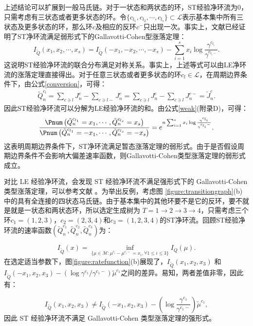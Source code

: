 上述结论可以扩展到一般马氏链。对于一状态和两状态的环，ST经验净环流为0，只需考虑有三状态或者更多状态的环。令$\{c_{l_1}, c_{l_2},\cdots, c_{l_s}\} \subset \mathcal{L}$表示基本集中所有三状态及更多状态的环，那么环$c$及相应的反环$c^-$只出现一次。事实上，文献\cite{andrieux2007fluctuation}已经证明了ST净环流满足弱形式下的Gallavotti-Cohen型涨落定理：
\begin{equation} \label{Gallavotti}
    I_{\tilde{Q}}(x_1,x_2,\cdots,x_s)
    = I_{\tilde{Q}}(-x_1,-x_2,\cdots,-x_s)
    -\sum_{i=1}^s x_i\log\frac{\gamma^{c_{l_i}}}{\gamma^{c_{l_{i}-}}}.
\end{equation}
这说明ST经验净环流的联合分布满足对称关系。事实上，上述等式可以由LE净环流的涨落定理直接得出。对于任意三状态或者更多状态的环$c_l \in \mathcal{L}$，在周期边界条件下，由公式\ref{conversion}，可得：
\begin{equation*}\label{circulation}
    \begin{split}
    \tilde{Q}^{c_l}_n =\sum_{c\ni l}J^c_n-\sum_{c\ni l-}J^c_n
    =\sum_{c\ni l}J^c_n-\sum_{c\ni l}J^{c-}_n = \tilde{J}^c_n.
    \end{split}
\end{equation*}
因此ST经验净环流可以分解为LE经验净环流的和。由公式\ref{weak}(附录D)，可得：
\begin{equation}\label{weak}
    \begin{split}
    \frac{\Pnum\left(\tilde{Q}^{c_{l_1}}_n=x_1,\cdots, \tilde{Q}^{c_{l_s}}_n=x_{s}\right)}
    {\Pnum\left(\tilde{Q}^{c_{l_1}}_n=-x_1,\cdots, \tilde{Q}^{c_{l_s}}_n=-x_{s}\right)}
    =e^{n\sum_{i=1}^{s}x_i\log\frac{\gamma^{c_{l_i}}}{\gamma^{c_{l_i}-}}}.
    \end{split}
\end{equation}
这表明周期边界条件下，ST净环流满足暂态涨落定理的弱形式。由于是否假设周期边界条件不会影响大偏差速率函数，则Gallavotti-Cohen类型涨落定理的弱形式 \cite{Gallavotti} 成立。

对比 LE 经验净环流，会发现 ST 经验净环流不满足强形式下的 Gallavotti-Cohen 类型涨落定理，可以参考文献 \cite{mehl2012role, polettini2017effective, uhl2018fluctuations, kahlen2018hidden}。为举出反例，考虑图 \ref{figure:transitiongraph}(b) 中的具有全连接的四状态马氏链。由于基本集中的其他环要不是它的反环，要不就是就是一状态和两状态环，所以选定生成树为 $T=1\to2\to3\to4$，只需考虑三个环$c_1=(1,2,3)$，$c_2=(2,3,4)$和$c_3=(1,2,3,4)$的ST净环流。回顾ST经验净环流的速率函数$(\tilde{Q}_n^{c_1}, \tilde{Q}_n^{c_2}, \tilde{Q}_n^{c_3})$为：


\begin{equation}
	I_{\tilde{Q}}(x)=\inf_{\{\mu\in\mathcal{M}:\mu^{c_i}-\mu^{c_i-}= x_i,\forall 1\le i\le 3\}}I_Q(\mu).
\end{equation}
在选定适当参数下，图\ref{figure:ratefunction}(b)展现了，$I_{\tilde{Q}}(x_1, x_2, x_3)$ 和 $ I_{\tilde{Q}}(-x_1, x_2, x_3) -\left(\log \gamma^{c_1} / \gamma^{c_1-}\right)\tilde{\mu}^{c_1}$之间的差异。易知，两者差值非零，因此有：

\begin{equation}
    I_{\tilde{Q}}(x_1, x_2, x_3) \neq I_{\tilde{Q}}(-x_1, x_2, x_3) -\left(\log\frac{\gamma^{c_1}}{\gamma^{c_1-}}\right)\tilde{\mu}^{c_1},
\end{equation}
因此 ST 经验净环流不满足 Gallavotti-Cohen 类型涨落定理的强形式。